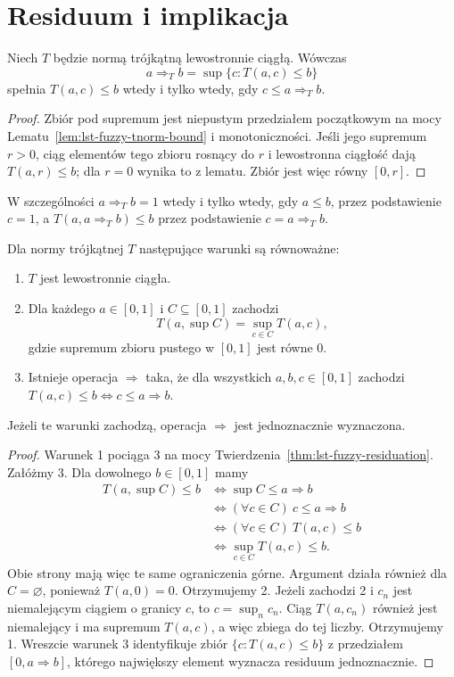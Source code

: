 \section{Residuum i implikacja}
\begin{twierdzenie}\label{thm:lst-fuzzy-residuation}
Niech $T$ będzie normą trójkątną lewostronnie ciągłą. Wówczas
\[
a\Rightarrow_T b=\sup\{c:T(a,c)\leq b\}
\]
spełnia $T(a,c)\leq b$ wtedy i tylko wtedy, gdy $c\leq a\Rightarrow_T b$.
\end{twierdzenie}
\begin{proof}
Zbiór pod supremum jest niepustym przedziałem początkowym na mocy
Lematu~\ref{lem:lst-fuzzy-tnorm-bound} i monotoniczności.
Jeśli jego supremum $r>0$, ciąg elementów tego zbioru rosnący do $r$
i lewostronna ciągłość dają $T(a,r)\leq b$; dla $r=0$ wynika to z lematu.
Zbiór jest więc równy $[0,r]$.
\end{proof}
W szczególności $a\Rightarrow_T b=1$ wtedy i tylko wtedy, gdy $a\leq b$,
przez podstawienie $c=1$, a $T(a,a\Rightarrow_T b)\leq b$ przez
podstawienie $c=a\Rightarrow_T b$.
\begin{twierdzenie}
\label{thm:ncl-residuation-equivalences}
Dla normy trójkątnej $T$ następujące warunki są równoważne:
\begin{enumerate}
\item $T$ jest lewostronnie ciągła.
\item Dla każdego $a\in[0,1]$ i $C\subseteq[0,1]$ zachodzi
\[
 T(a,\sup C)=\sup_{c\in C}T(a,c),
\]
gdzie supremum zbioru pustego w $[0,1]$ jest równe $0$.
\item Istnieje operacja $\Rightarrow$ taka, że dla wszystkich
$a,b,c\in[0,1]$ zachodzi
$T(a,c)\leq b\iff c\leq a\Rightarrow b$.
\end{enumerate}
Jeżeli te warunki zachodzą, operacja $\Rightarrow$ jest
jednoznacznie wyznaczona.
\end{twierdzenie}
\begin{proof}
Warunek 1 pociąga 3 na mocy
Twierdzenia~\ref{thm:lst-fuzzy-residuation}.
Załóżmy 3. Dla dowolnego $b\in[0,1]$ mamy
\[
\begin{aligned}
 T(a,\sup C)\leq b
 &\iff \sup C\leq a\Rightarrow b\\
 &\iff (\forall c\in C)\ c\leq a\Rightarrow b\\
 &\iff (\forall c\in C)\ T(a,c)\leq b\\
 &\iff \sup_{c\in C}T(a,c)\leq b.
\end{aligned}
\]
Obie strony mają więc te same ograniczenia górne.
Argument działa również dla $C=\varnothing$, ponieważ
$T(a,0)=0$. Otrzymujemy 2.
Jeżeli zachodzi 2 i $c_n$ jest niemalejącym ciągiem
o granicy $c$, to $c=\sup_n c_n$. Ciąg $T(a,c_n)$
również jest niemalejący i ma supremum $T(a,c)$,
a więc zbiega do tej liczby. Otrzymujemy 1.
Wreszcie warunek 3 identyfikuje zbiór
$\{c:T(a,c)\leq b\}$ z przedziałem $[0,a\Rightarrow b]$,
którego największy element wyznacza residuum jednoznacznie.
\end{proof}

